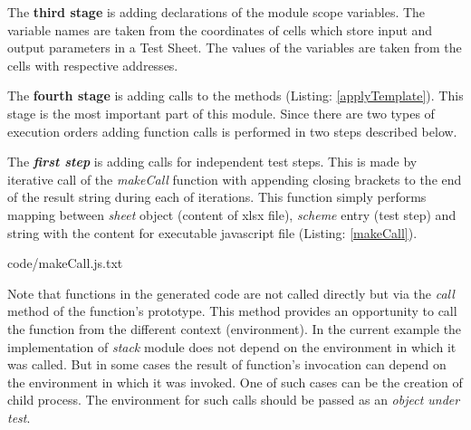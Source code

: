 The \textbf{third stage} is adding declarations of the module scope variables. The variable names are taken from the coordinates of cells which store input and output parameters in a Test Sheet. The values of the variables are taken from the cells with respective addresses.


The \textbf{fourth stage} is adding calls to the methods (Listing: \ref{applyTemplate}). This stage is the most important part of this module. Since there are two types of execution orders adding function calls is performed in two steps described below. 


The \textit{\textbf{first step}} is adding calls for independent test steps. This is made by iterative call of the \textit{makeCall} function with appending closing brackets to the end of the result string during each of iterations. This function simply performs mapping between \textit{sheet} object (content of xlsx file), \textit{scheme} entry (test step) and string with the content for executable javascript file (Listing: \ref{makeCall}).


{code/makeCall.js.txt}

Note that functions in the generated code are not called directly but via the \textit{call} method of the function's prototype. This method provides an opportunity to call the function from the different context (environment). In the current example the implementation of \textit{stack} module does not depend on the environment in which it was called. But in some cases the result of function's invocation can depend on the environment in which it was invoked. One of such cases can be the creation of child process. The environment for such calls should be passed as an \textit{object under test}.


